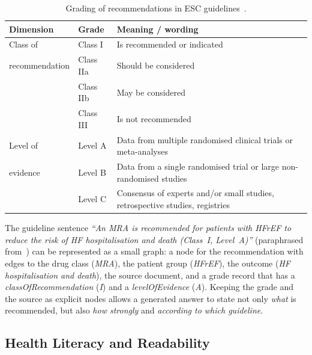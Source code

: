 \begin{table}[htbp]
  \centering
  \small
  \begin{tabular}{@{}p{2.9cm}p{1.9cm}p{7.6cm}@{}}
    \toprule
    \textbf{Dimension} & \textbf{Grade} & \textbf{Meaning / wording} \\
    \midrule
    Class of        & Class I   & Is recommended or indicated \\
    recommendation  & Class IIa & Should be considered \\
                    & Class IIb & May be considered \\
                    & Class III & Is not recommended \\
    \midrule
    Level of        & Level A & Data from multiple randomised clinical trials or meta-analyses \\
    evidence        & Level B & Data from a single randomised trial or large non-randomised studies \\
                    & Level C & Consensus of experts and/or small studies, retrospective studies, registries \\
    \bottomrule
  \end{tabular}
  \caption{Grading of recommendations in ESC guidelines~\cite{mcdonagh2021esc}.}
  \label{tab:bg-grades}
\end{table}

\begin{bgexample}
The guideline sentence \emph{``An MRA is recommended for patients with HFrEF
to reduce the risk of HF hospitalisation and death (Class~I, Level~A)''}
(paraphrased from~\cite{mcdonagh2021esc}) can be represented as a small
graph: a node for the recommendation with edges to the drug class
(\textit{MRA}), the patient group (\textit{HFrEF}), the outcome
(\textit{HF hospitalisation and death}), the source document, and a grade
record that has a \textit{classOfRecommendation} (\textit{I}) and a
\textit{levelOfEvidence} (\textit{A}). Keeping the grade and the source as
explicit nodes allows a generated answer to state not only \emph{what} is
recommended, but also \emph{how strongly} and \emph{according to which
guideline}.
\end{bgexample}

\subsection{Health Literacy and Readability}
\label{sec:bg-readability}


